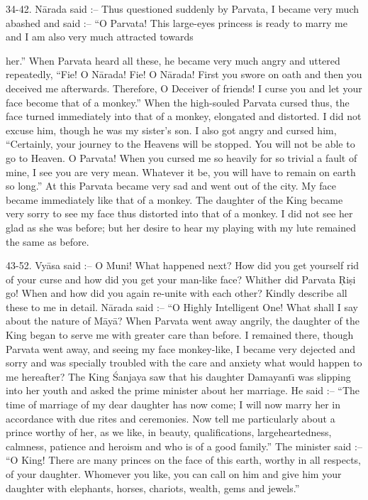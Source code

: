 34-42. N\=arada said :-- Thus questioned suddenly by Parvata, I became very much abashed and said :-- ``O Parvata! This large-eyes princess is ready to marry me and I am also very much attracted towards

her.'' When Parvata heard all these, he became very much angry and uttered repeatedly, ``Fie! O N\=arada! Fie! O N\=arada! First you swore on oath and then you deceived me afterwards. Therefore, O Deceiver of friends! I curse you and let your face become that of a monkey.'' When the high-souled Parvata cursed thus, the face turned immediately into that of a monkey, elongated and distorted. I did not excuse him, though he was my sister's son. I also got angry and cursed him, ``Certainly, your journey to the Heavens will be stopped. You will not be able to go to Heaven. O Parvata! When you cursed me so heavily for so trivial a fault of mine, I see you are very mean. Whatever it be, you will have to remain on earth so long.'' At this Parvata became very sad and went out of the city. My face became immediately like that of a monkey. The daughter of the King became very sorry to see my face thus distorted into that of a monkey. I did not see her glad as she was before; but her desire to hear my playing with my lute remained the same as before.

43-52. Vy\=asa said :-- O Muni! What happened next? How did you get yourself rid of your curse and how did you get your man-like face? Whither did Parvata \d{R}i\d{s}i go! When and how did you again re-unite with each other? Kindly describe all these to me in detail. N\=arada said :-- ``O Highly Intelligent One! What shall I say about the nature of M\=ay\=a? When Parvata went away angrily, the daughter of the King began to serve me with greater care than before. I remained there, though Parvata went away, and seeing my face monkey-like, I became very dejected and sorry and was specially troubled with the care and anxiety what would happen to me hereafter? The King \'Sanjaya saw that his daughter Damayant\={\i} was slipping into her youth and asked the prime minister about her marriage. He said :-- ``The time of marriage of my dear daughter has now come; I will now marry her in accordance with due rites and ceremonies. Now tell me particularly about a prince worthy of her, as we like, in beauty, qualifications, largeheartedness, calmness, patience and heroism and who is of a good family.'' The minister said :-- ``O King! There are many princes on the face of this earth, worthy in all respects, of your daughter. Whomever you like, you can call on him and give him your daughter with elephants, horses, chariots, wealth, gems and jewels.''

